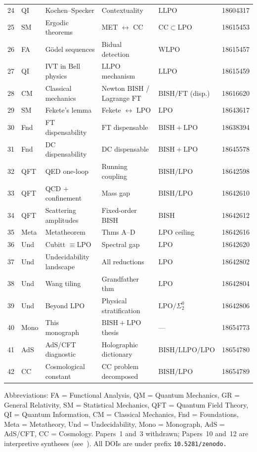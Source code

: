 \documentclass[11pt,a4paper]{report}
\theoremstyle{plain}
\theoremstyle{definition}
\theoremstyle{remark}
\newcommand{\BISH}{\mathrm{BISH}}
\newcommand{\LLPO}{\mathrm{LLPO}}
\newcommand{\WLPO}{\mathrm{WLPO}}
\newcommand{\LPO}{\mathrm{LPO}}
\newcommand{\FT}{\mathrm{FT}}
\newcommand{\DC}{\mathrm{DC}}
\newcommand{\CCax}{\mathrm{CC}}
\begin{document}
{\begin{longtable}{@{}clp{3.2cm}p{3cm}lp{2cm}@{}}
24 & QI  & Kochen--Specker     & Contextuality & $\LLPO$ & 18604317 \\
25 & SM  & Ergodic theorems    & MET $\leftrightarrow$ $\CCax$ & $\CCax \subset \LPO$ & 18615453 \\
26 & FA  & G\"odel sequences   & Bidual detection & $\WLPO$ & 18615457 \\
27 & QI  & IVT in Bell physics & $\LLPO$ mechanism & $\LLPO$ & 18615459 \\
28 & CM  & Classical mechanics  & Newton $\BISH$ / Lagrange $\FT$ & $\BISH/\FT$ (disp.) & 18616620 \\
29 & SM  & Fekete's lemma      & Fekete $\leftrightarrow$ $\LPO$ & $\LPO$ & 18643617 \\
30 & Fnd & FT dispensability   & $\FT$ dispensable & $\BISH+\LPO$ & 18638394 \\
31 & Fnd & DC dispensability   & $\DC$ dispensable & $\BISH+\LPO$ & 18645578 \\
32 & QFT & QED one-loop        & Running coupling & $\BISH/\LPO$ & 18642598 \\
33 & QFT & QCD + confinement   & Mass gap & $\BISH/\LPO$ & 18642610 \\
34 & QFT & Scattering amplitudes & Fixed-order BISH & $\BISH$ & 18642612 \\
35 & Meta & Metatheorem        & Thms A--D & $\LPO$ ceiling & 18642616 \\
36 & Und & Cubitt $\equiv \LPO$ & Spectral gap & $\LPO$ & 18642620 \\
37 & Und & Undecidability landscape & All reductions & $\LPO$ & 18642802 \\
38 & Und & Wang tiling         & Grandfather thm & $\LPO$ & 18642804 \\
39 & Und & Beyond LPO          & Physical stratification & $\LPO/\Sigma^0_2$ & 18642806 \\
40 & Mono & This monograph       & $\BISH+\LPO$ thesis & --- & 18654773 \\
41 & AdS & AdS/CFT diagnostic  & Holographic dictionary & $\BISH/\LLPO/\LPO$ & 18654780 \\
42 & CC  & Cosmological constant & CC problem decomposed & $\BISH/\LPO$ & 18654789 \\
\end{longtable}
}

Abbreviations: FA = Functional Analysis, QM = Quantum Mechanics, GR = General Relativity, SM = Statistical Mechanics, QFT = Quantum Field Theory, QI = Quantum Information, CM = Classical Mechanics, Fnd = Foundations, Meta = Metatheory, Und = Undecidability, Mono = Monograph, AdS = AdS/CFT, CC = Cosmology. Papers~1 and~3 withdrawn; Papers~10 and~12 are interpretive syntheses (see~\cite{Lee2026P10,Lee2026P12}). All DOIs are under prefix \texttt{10.5281/zenodo.}
\end{document}
